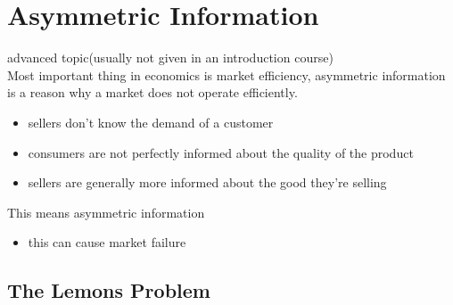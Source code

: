 \documentclass[12pt, a4paper, titlepage]{extarticle}
\begin{document}
	\section{Asymmetric Information}
    advanced topic(usually not given in an introduction course)\\
    Most important thing in economics is market efficiency, asymmetric information is a reason why a market does not operate efficiently.
    \begin{itemize}
    \item sellers don't know the demand of a customer
    \item consumers are not perfectly informed about the quality of the product
    \item sellers are generally more informed about the good they're selling
    \end{itemize}
    This means asymmetric information
    \begin{itemize}
    \item this can cause market failure
    \end{itemize}
    
    \subsection{The Lemons Problem}
    
\end{document}
